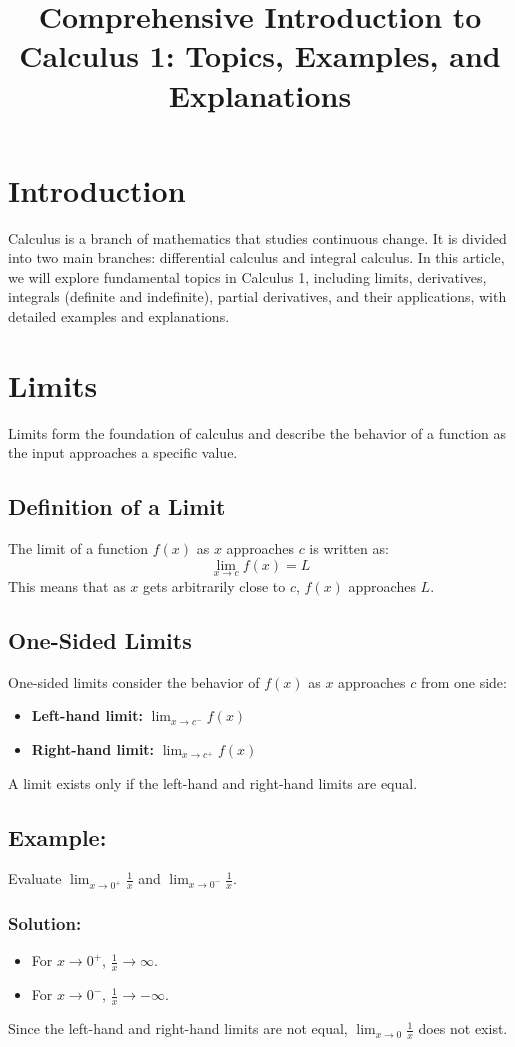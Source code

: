 \documentclass[12pt]{article}
\title{Comprehensive Introduction to Calculus 1: Topics, Examples, and Explanations}
\author{}
\date{}
\begin{document}
\maketitle

\section*{Introduction}
Calculus is a branch of mathematics that studies continuous change. It is divided into two main branches: differential calculus and integral calculus. In this article, we will explore fundamental topics in Calculus 1, including limits, derivatives, integrals (definite and indefinite), partial derivatives, and their applications, with detailed examples and explanations.

\section{Limits}
Limits form the foundation of calculus and describe the behavior of a function as the input approaches a specific value.

\subsection*{Definition of a Limit}
The limit of a function $f(x)$ as $x$ approaches $c$ is written as:
\[ \lim_{x \to c} f(x) = L \]
This means that as $x$ gets arbitrarily close to $c$, $f(x)$ approaches $L$.

\subsection*{One-Sided Limits}
One-sided limits consider the behavior of $f(x)$ as $x$ approaches $c$ from one side:
\begin{itemize}
    \item \textbf{Left-hand limit:} $\lim_{x \to c^-} f(x)$
    \item \textbf{Right-hand limit:} $\lim_{x \to c^+} f(x)$
\end{itemize}
A limit exists only if the left-hand and right-hand limits are equal.

\subsection*{Example:}
Evaluate $\lim_{x \to 0^+} \frac{1}{x}$ and $\lim_{x \to 0^-} \frac{1}{x}$.

\subsubsection*{Solution:}
\begin{itemize}
    \item For $x \to 0^+$, $\frac{1}{x} \to \infty$.
    \item For $x \to 0^-$, $\frac{1}{x} \to -\infty$.
\end{itemize}
Since the left-hand and right-hand limits are not equal, $\lim_{x \to 0} \frac{1}{x}$ does not exist.
\end{document}
